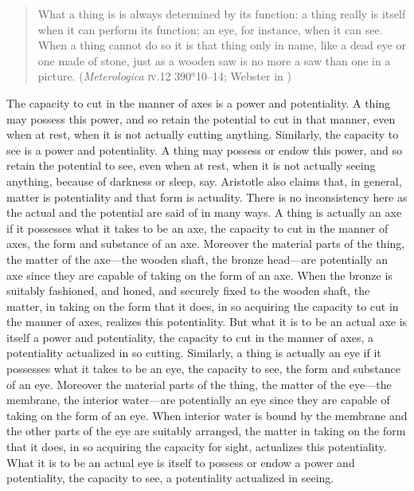 \begin{quote}
	What a thing is is always determined by its function: a thing really is itself when it can perform its function; an eye, for instance, when it can see. When a thing cannot do so it is that thing only in name, like a dead eye or one made of stone, just as a wooden saw is no more a saw than one in a picture. (\emph{Meterologica} \textsc{iv}.12 390\( ^{a} \)10--14; Webster in \citealt[86]{Barnes:1984uq})
\end{quote}

The capacity to cut in the manner of axes is a power and potentiality. A thing may possess this power, and so retain the potential to cut in that manner, even when at rest, when it is not actually cutting anything. Similarly, the capacity to see is a power and potentiality. A thing may possess or endow this power, and so retain the potential to see, even when at rest, when it is not actually seeing anything, because of darkness or sleep, say. Aristotle also claims that, in general, matter is potentiality and that form is actuality. There is no inconsistency here as the actual and the potential are said of in many ways. A thing is actually an axe if it possesses what it takes to be an axe, the capacity to cut in the manner of axes, the form and substance of an axe. Moreover the material parts of the thing, the matter of the axe---the wooden shaft, the bronze head---are potentially an axe since they are capable of taking on the form of an axe. When the bronze is suitably fashioned, and honed, and securely fixed to the wooden shaft, the matter, in taking on the form that it does, in so acquiring the capacity to cut in the manner of axes, realizes this potentiality. But what it is to be an actual axe is itself a power and potentiality, the capacity to cut in the manner of axes, a potentiality actualized in so cutting. Similarly, a thing is actually an eye if it possesses what it takes to be an eye, the capacity to see, the form and substance of an eye. Moreover the material parts of the thing, the matter of the eye---the membrane, the interior water---are potentially an eye since they are capable of taking on the form of an eye. When interior water is bound by the membrane and the other parts of the eye are suitably arranged, the matter in taking on the form that it does, in so acquiring the capacity for sight, actualizes this potentiality. What it is to be an actual eye is itself to possess or endow a power and potentiality, the capacity to see, a potentiality actualized in seeing.

